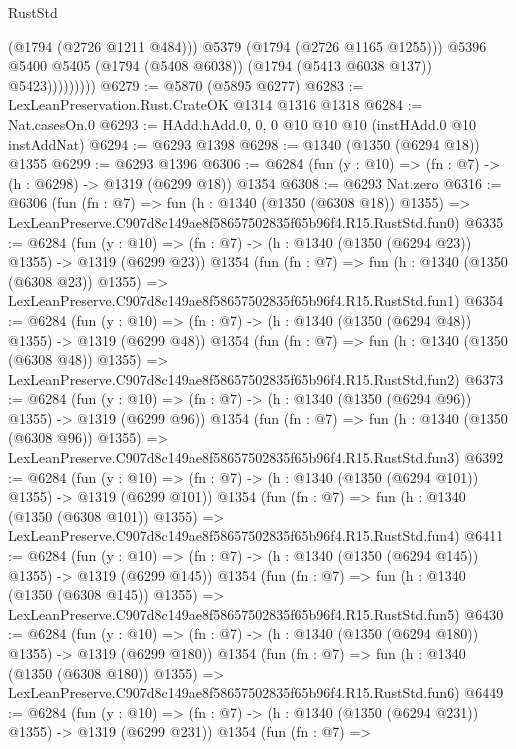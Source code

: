 \begin{lexlean}{RustStd}
\begin{coremodule}
                          (@1794 (@2726 @1211 @484)))
                        @5379
                        (@1794 (@2726 @1165 @1255)))
                      @5396
                      @5400
                      @5405
                      (@1794 (@5408 @6038))
                      (@1794 (@5413 @6038 @137))
                      @5423)))))))))
@6279 := @5870 (@5895 @6277)
@6283 := LexLeanPreservation.Rust.CrateOK @1314 @1316 @1318
@6284 := Nat.casesOn.{0}
@6293 := HAdd.hAdd.{0, 0, 0} @10 @10 @10 (instHAdd.{0} @10 instAddNat)
@6294 := @6293 @1398
@6298 := @1340 (@1350 (@6294 @18)) @1355
@6299 := @6293 @1396
@6306 := @6284 (fun (y : @10) => (fn : @7) -> (h : @6298) -> @1319 (@6299 @18)) @1354
@6308 := @6293 Nat.zero
@6316 := @6306
    (fun (fn : @7) =>
    fun (h : @1340 (@1350 (@6308 @18)) @1355) =>
    LexLeanPreserve.C907d8c149ae8f58657502835f65b96f4.R15.RustStd.fun0)
@6335 := @6284
    (fun (y : @10) => (fn : @7) -> (h : @1340 (@1350 (@6294 @23)) @1355) -> @1319 (@6299 @23))
    @1354
    (fun (fn : @7) =>
    fun (h : @1340 (@1350 (@6308 @23)) @1355) =>
    LexLeanPreserve.C907d8c149ae8f58657502835f65b96f4.R15.RustStd.fun1)
@6354 := @6284
    (fun (y : @10) => (fn : @7) -> (h : @1340 (@1350 (@6294 @48)) @1355) -> @1319 (@6299 @48))
    @1354
    (fun (fn : @7) =>
    fun (h : @1340 (@1350 (@6308 @48)) @1355) =>
    LexLeanPreserve.C907d8c149ae8f58657502835f65b96f4.R15.RustStd.fun2)
@6373 := @6284
    (fun (y : @10) => (fn : @7) -> (h : @1340 (@1350 (@6294 @96)) @1355) -> @1319 (@6299 @96))
    @1354
    (fun (fn : @7) =>
    fun (h : @1340 (@1350 (@6308 @96)) @1355) =>
    LexLeanPreserve.C907d8c149ae8f58657502835f65b96f4.R15.RustStd.fun3)
@6392 := @6284
    (fun (y : @10) => (fn : @7) -> (h : @1340 (@1350 (@6294 @101)) @1355) -> @1319 (@6299 @101))
    @1354
    (fun (fn : @7) =>
    fun (h : @1340 (@1350 (@6308 @101)) @1355) =>
    LexLeanPreserve.C907d8c149ae8f58657502835f65b96f4.R15.RustStd.fun4)
@6411 := @6284
    (fun (y : @10) => (fn : @7) -> (h : @1340 (@1350 (@6294 @145)) @1355) -> @1319 (@6299 @145))
    @1354
    (fun (fn : @7) =>
    fun (h : @1340 (@1350 (@6308 @145)) @1355) =>
    LexLeanPreserve.C907d8c149ae8f58657502835f65b96f4.R15.RustStd.fun5)
@6430 := @6284
    (fun (y : @10) => (fn : @7) -> (h : @1340 (@1350 (@6294 @180)) @1355) -> @1319 (@6299 @180))
    @1354
    (fun (fn : @7) =>
    fun (h : @1340 (@1350 (@6308 @180)) @1355) =>
    LexLeanPreserve.C907d8c149ae8f58657502835f65b96f4.R15.RustStd.fun6)
@6449 := @6284
    (fun (y : @10) => (fn : @7) -> (h : @1340 (@1350 (@6294 @231)) @1355) -> @1319 (@6299 @231))
    @1354
    (fun (fn : @7) =>

\end{coremodule}
\end{lexlean}

